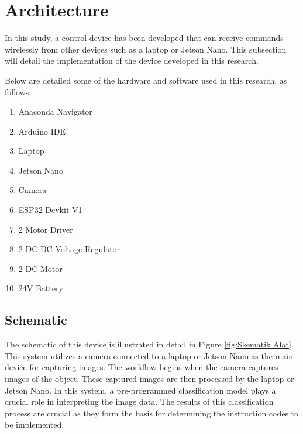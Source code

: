 \section{Architecture}
\label{sec:arsitektur}

In this study, a control device has been developed that can receive commands wirelessly from other devices such as a laptop or Jetson Nano. This subsection will detail the implementation of the device developed in this research.

Below are detailed some of the hardware and software used in this research, as follows:
\begin{enumerate}
    \item Anaconda Navigator
    \item Arduino IDE 
    \item Laptop 
    \item Jetson Nano
    \item Camera
    \item ESP32 Devkit V1
    \item 2 Motor Driver
    \item 2 DC-DC Voltage Regulator
    \item 2 DC Motor
    \item 24V Battery
\end{enumerate}

\subsection{Schematic}
\label{subsec:skematik alat}

The schematic of this device is illustrated in detail in Figure \ref{fig:Skematik Alat}. This system utilizes a camera connected to a laptop or Jetson Nano as the main device for capturing images. The workflow begins when the camera captures images of the object. These captured images are then processed by the laptop or Jetson Nano. In this system, a pre-programmed classification model plays a crucial role in interpreting the image data. The results of this classification process are crucial as they form the basis for determining the instruction codes to be implemented.

